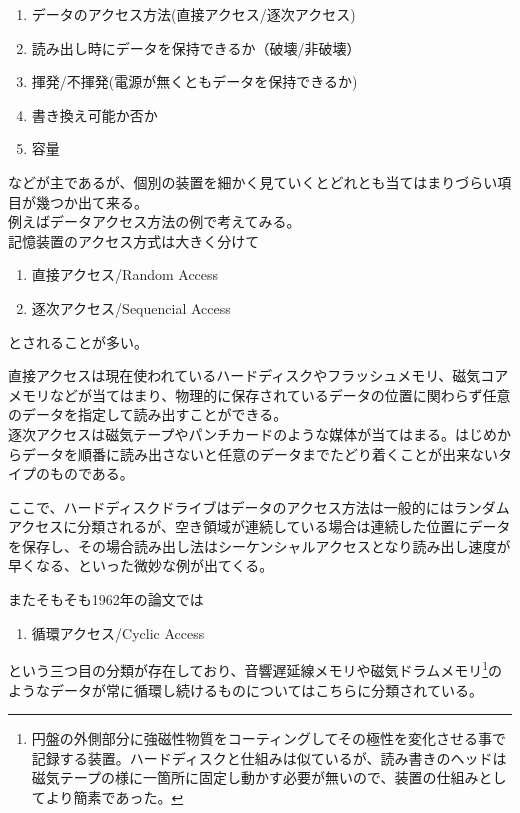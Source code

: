 \documentclass[a4paper,report]{jsbook}
\begin{document}
\begin{enumerate}
\def\labelenumi{\arabic{enumi}.}
\tightlist
\item
  データのアクセス方法(直接アクセス/逐次アクセス)
\item
  読み出し時にデータを保持できるか（破壊/非破壊）
\item
  揮発/不揮発(電源が無くともデータを保持できるか)
\item
  書き換え可能か否か
\item
  容量
\end{enumerate}

などが主であるが、個別の装置を細かく見ていくとどれとも当てはまりづらい項目が幾つか出て来る。\\
例えばデータアクセス方法の例で考えてみる。\\
記憶装置のアクセス方式は大きく分けて

\begin{enumerate}
\def\labelenumi{\arabic{enumi}.}
\tightlist
\item
  直接アクセス/Random Access
\item
  逐次アクセス/Sequencial Access
\end{enumerate}

とされることが多い。

直接アクセスは現在使われているハードディスクやフラッシュメモリ、磁気コアメモリなどが当てはまり、物理的に保存されているデータの位置に関わらず任意のデータを指定して読み出すことができる。\\
逐次アクセスは磁気テープやパンチカードのような媒体が当てはまる。はじめからデータを順番に読み出さないと任意のデータまでたどり着くことが出来ないタイプのものである。

ここで、ハードディスクドライブはデータのアクセス方法は一般的にはランダムアクセスに分類されるが、空き領域が連続している場合は連続した位置にデータを保存し、その場合読み出し法はシーケンシャルアクセスとなり読み出し速度が早くなる、といった微妙な例が出てくる。

またそもそも1962年の論文では

\begin{enumerate}
\def\labelenumi{\arabic{enumi}.}
\tightlist
\item
  循環アクセス/Cyclic Access
\end{enumerate}

という三つ目の分類が存在しており、音響遅延線メモリや磁気ドラムメモリ\footnote{円盤の外側部分に強磁性物質をコーティングしてその極性を変化させる事で記録する装置。ハードディスクと仕組みは似ているが、読み書きのヘッドは磁気テープの様に一箇所に固定し動かす必要が無いので、装置の仕組みとしてより簡素であった。}のようなデータが常に循環し続けるものについてはこちらに分類されている\autocite{ishii:memory}。
\end{document}
